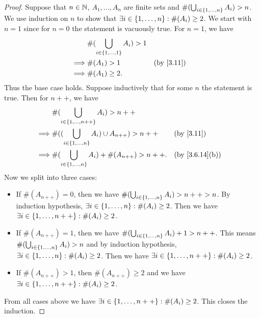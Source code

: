\begin{proof}
  Suppose that \(n \in \mathbb{N}\), \(A_1, \dots, A_n\) are finite sets and \(\#(\bigcup_{i \in \left\lbrace1, \dots, n\right\rbrace} A_i) > n\).
  We use induction on \(n\) to show that \(\exists i \in \left\lbrace1, \dots, n\right\rbrace : \#(A_i) \geq 2\).
  We start with \(n = 1\) since for \(n = 0\) the statement is vacuously true.
  For \(n = 1\), we have
  \begin{align*}
             & \#(\bigcup_{i \in \set{1, \dots, 1}} A_i) > 1                              \\
    \implies & \#(A_1) > 1                                   &  & \text{(by \cref{3.11})} \\
    \implies & \#(A_1) \geq 2.
  \end{align*}
  Thus the base case holds.
  Suppose inductively that for some \(n\) the statement is true.
  Then for \(n++\), we have
  \begin{align*}
             & \#(\bigcup_{i \in \set{1, \dots, n++}} A_i) > n++                                                \\
    \implies & \#((\bigcup_{i \in \set{1, \dots, n}} A_i) \cup A_{n++}) > n++ &  & \text{(by \cref{3.11})}      \\
    \implies & \#(\bigcup_{i \in \set{1, \dots, n}} A_i) + \#(A_{n++}) > n++. &  & \text{(by \cref{3.6.14}(b))}
  \end{align*}
  Now we split into three cases:
  \begin{itemize}
    \item If \(\#(A_{n++}) = 0\), then we have \(\#(\bigcup_{i \in \left\lbrace1, \dots, n\right\rbrace} A_i) > n++ > n\).
          By induction hypothesis, \(\exists i \in \left\lbrace1, \dots, n\right\rbrace : \#(A_i) \geq 2\).
          Then we have \(\exists i \in \left\lbrace1, \dots, n++\right\rbrace : \#(A_i) \geq 2\).
    \item If \(\#(A_{n++}) = 1\), then we have \(\#(\bigcup_{i \in \left\lbrace1, \dots, n\right\rbrace} A_i) + 1 > n++\).
          This means \(\#(\bigcup_{i \in \left\lbrace1, \dots, n\right\rbrace} A_i) > n\) and by induction hypothesis, \(\exists i \in \left\lbrace1, \dots, n\right\rbrace : \#(A_i) \geq 2\).
          Then we have \(\exists i \in \left\lbrace1, \dots, n++\right\rbrace : \#(A_i) \geq 2\).
    \item If \(\#(A_{n++}) > 1\), then \(\#(A_{n++}) \geq 2\) and we have \(\exists i \in \left\lbrace1, \dots, n++\right\rbrace : \#(A_i) \geq 2\).
  \end{itemize}
  From all cases above we have \(\exists i \in \left\lbrace1, \dots, n++\right\rbrace : \#(A_i) \geq 2\).
  This closes the induction.
\end{proof}